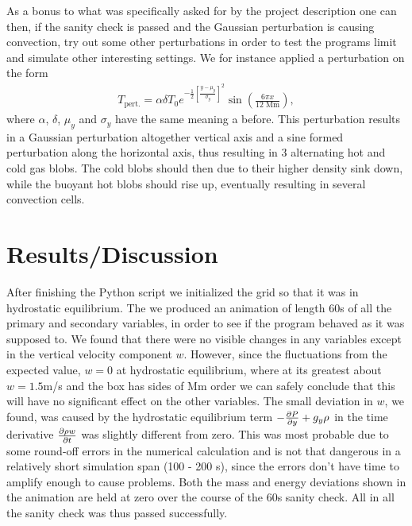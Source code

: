 \documentclass{emulateapj}
\begin{document}
	As a bonus to what was specifically asked for by the project description one can then, if the sanity check is passed and the Gaussian perturbation is causing convection, try out some other perturbations in order to test the programs limit and simulate other interesting settings. We for instance applied a perturbation on the form 
	\begin{align}
		T_\text{pert.} = \alpha \delta T_0 e^{-\frac{1}{2}\left[\frac{y - \mu_y}{\sigma_y}\right]^2}\sin(\frac{6\pi x}{12\text{ Mm}}),
		\label{eq:bonus_pert}
	\end{align}
	where $\alpha$, $\delta$, $\mu_y$ and $\sigma_y$ have the same meaning a before. This perturbation results in a Gaussian perturbation altogether vertical axis and a sine formed perturbation along the horizontal axis, thus resulting in 3 alternating hot and cold gas blobs. The cold blobs should then due to their higher density sink down, while the buoyant hot blobs should rise up, eventually resulting in several convection cells.
	
	\section*{Results/Discussion}
	After finishing the Python script we initialized the grid so that it was in hydrostatic equilibrium. The we produced an animation of length 60s of all the primary and secondary variables, in order to see if the program behaved as it was supposed to. We found that there were no visible changes in any variables except in the vertical velocity component $w$. However, since the fluctuations from the expected value, $w = 0$ at hydrostatic equilibrium, where at its greatest about $w = 1.5$m/s and the box has sides of Mm order we can safely conclude that this will have no significant effect on the other variables. The small deviation in $w$, we found, was caused by the hydrostatic equilibrium term $-\pdv{P}{y} + g_y \rho$ in the time derivative $\pdv{\rho w}{t}$ was slightly different from zero. This was most probable due to some round-off errors in the numerical calculation and is not that dangerous in a relatively short simulation span (100 - 200 s), since the errors don't have time to amplify enough to cause problems. Both the mass and energy deviations shown in the animation are held at zero over the course of the 60s sanity check. All in all the sanity check was thus passed successfully.
	
\end{document}
